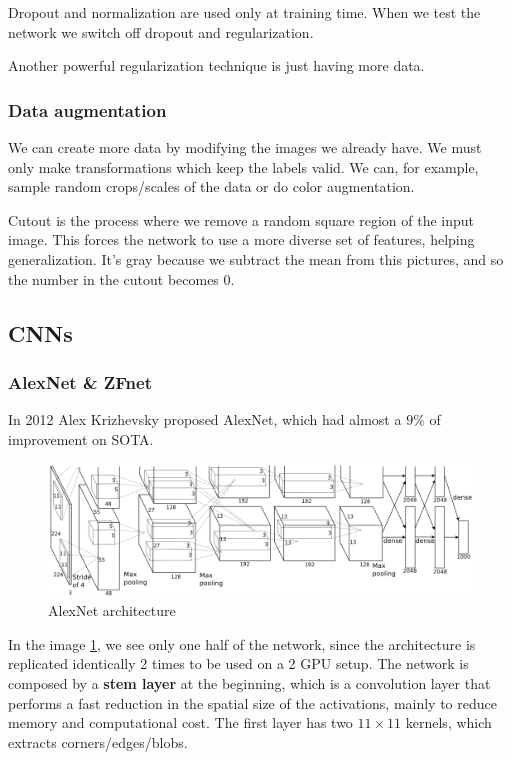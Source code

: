 \documentclass{article}
\begin{document}
Dropout and normalization are used only at training time.
When we test the network we switch off dropout and regularization.

Another powerful regularization technique is just having more data.

\subsubsection{Data augmentation}
We can create more data by modifying the images we already have.
We must only make transformations which keep the labels valid.
We can, for example, sample random crops/scales of the data or do color augmentation.

Cutout is the process where we remove a random square region of the input image.
This forces the network to use a more diverse set of features, helping generalization.
It's gray because we subtract the mean from this pictures, and so the number in the cutout becomes 0.

\subsection{CNNs}

\subsubsection{AlexNet \& ZFnet}
In 2012 Alex Krizhevsky proposed AlexNet, which had almost a $9\%$ of improvement on SOTA.

\begin{figure}[htbp]
  \centering
  \includegraphics[width=0.8\linewidth]{./img/alexnet.png}
  \caption{AlexNet architecture}
  \label{fig:alexnet}
\end{figure}

In the image \ref{fig:alexnet}, we see only one half of the network, since the architecture is replicated identically 2 times to be used on a 2 GPU setup.
The network is composed by a \textbf{stem layer} at the beginning, which is a convolution layer that performs a fast reduction in the spatial size of the activations, mainly to reduce memory and computational cost.
The first layer has two $11 \times 11$ kernels, which extracts corners/edges/blobs.
\end{document}

